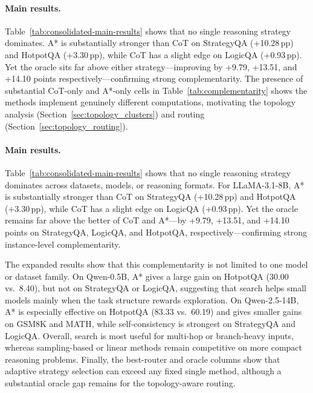 \documentclass{article}
\begin{document}
\paragraph{Main results.}
Table~\ref{tab:consolidated-main-results} shows that no single reasoning strategy dominates. A* is substantially stronger than CoT on StrategyQA (+10.28\,pp) and HotpotQA (+3.30\,pp), while CoT has a slight edge on LogicQA (+0.93\,pp). Yet the oracle sits far above either strategy---improving by +9.79, +13.51, and +14.10 points respectively---confirming strong complementarity. The presence of substantial CoT-only and A*-only cells in Table~\ref{tab:complementarity} shows the methods implement genuinely different computations, motivating the topology analysis (Section~\ref{sec:topology_clusters}) and routing (Section~\ref{sec:topology_routing}).



\paragraph{Main results.}
Table~\ref{tab:consolidated-main-results} shows that no single reasoning strategy dominates across datasets, models, or reasoning formats. For LLaMA-3.1-8B, A* is substantially stronger than CoT on StrategyQA (+10.28\,pp) and HotpotQA (+3.30\,pp), while CoT has a slight edge on LogicQA (+0.93\,pp). Yet the oracle remains far above the better of CoT and A*---by +9.79, +13.51, and +14.10 points on StrategyQA, LogicQA, and HotpotQA, respectively---confirming strong instance-level complementarity. 

The expanded results show that this complementarity is not limited to one model or dataset family. On Qwen-0.5B, A* gives a large gain on HotpotQA (30.00 vs.\ 8.40), but not on StrategyQA or LogicQA, suggesting that search helps small models mainly when the task structure rewards exploration. On Qwen-2.5-14B, A* is especially effective on HotpotQA (83.33 vs.\ 60.19) and gives smaller gains on GSM8K and MATH, while self-consistency is strongest on StrategyQA and LogicQA. Overall, search is most useful for multi-hop or branch-heavy inputs, whereas sampling-based or linear methods remain competitive on more compact reasoning problems. Finally, the best-router and oracle columns show that adaptive strategy selection can exceed any fixed single method, although a substantial oracle gap remains for the topology-aware routing.
\end{document}
